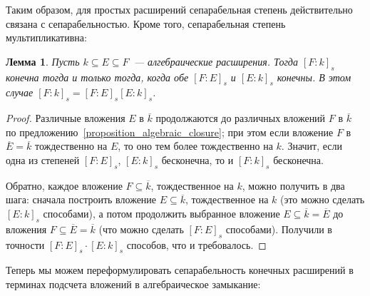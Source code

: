 \documentclass[a4paper,11pt]{scrartcl}
\theoremstyle{plain}
\newtheorem{lemma}[theorem]{Лемма}
\theoremstyle{definition}
\newcommand\sseq{\subseteq}
\begin{document}
Таким образом, для простых расширений сепарабельная степень
действительно связана с сепарабельностью. Кроме того, сепарабельная
степень мультипликативна:

\begin{lemma}\label{lemma_separable_degree_multiplicative}
Пусть $k\sseq E\sseq F$~--- алгебраические расширения. Тогда $[F:k]_s$
конечна тогда и только тогда, когда обе $[F:E]_s$ и $[E:k]_s$
конечны. В этом случае $[F:k]_s=[F:E]_s[E:k]_s$.
\end{lemma}
\begin{proof}
Различные вложения $E$ в $\overline{k}$ продолжаются до различных
вложений $F$ в $\overline{k}$ по
предложению~\ref{proposition_algebraic_closure}; при этом если
вложение $F$ в $\overline{E}=\overline{k}$ тождественно на $E$, то оно
тем более тождественно на $k$. Значит, если одна из степеней
$[F:E]_s$, $[E:k]_s$ бесконечна, то и $[F:k]_s$ бесконечна.

Обратно, каждое вложение $F\sseq\overline{k}$, тождественное на $k$,
можно получить в два шага: сначала построить вложение
$E\sseq\overline{k}$, тождественное на $k$ (это можно сделать
$[E:k]_s$ способами), а потом продолжить выбранное вложение
$E\sseq\overline{k}=\overline{E}$ до вложения
$F\sseq\overline{E}=\overline{k}$ (что можно сделать $[F:E]_s$
способами). Получили в точности $[F:E]_s\cdot[E:k]_s$ способов, что и
требовалось.
\end{proof}

Теперь мы можем переформулировать сепарабельность конечных расширений
в терминах подсчета вложений в алгебраическое замыкание:
\end{document}
